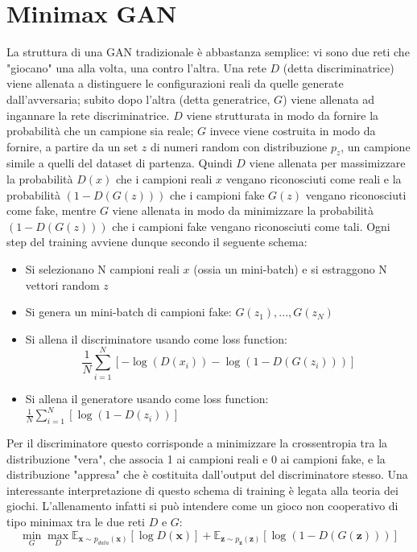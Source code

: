 \documentclass[Lau, noexaminfo, oneside]{sapthesis} %
\begin{document}
\section{Minimax GAN}
La struttura di una GAN tradizionale è abbastanza semplice: vi sono due reti che "giocano" una alla volta, una contro l'altra. Una rete $D$ (detta discriminatrice) viene allenata a distinguere le configurazioni reali da quelle generate dall'avversaria; subito dopo l'altra (detta generatrice, $G$) viene allenata ad ingannare la rete discriminatrice. $D$ viene strutturata in modo da fornire la probabilità che un campione sia reale; $G$ invece viene costruita in modo da fornire, a partire da un set $z$ di numeri random con distribuzione $p_z$, un campione simile a quelli del dataset di partenza. Quindi $D$ viene allenata per massimizzare la probabilità $D(x)$ che i campioni reali $x$ vengano riconosciuti come reali e la probabilità $(1-D(G(z)))$ che i campioni fake $G(z)$ vengano riconosciuti come fake, mentre $G$ viene allenata in modo da minimizzare la probabilità $(1-D(G(z)))$ che i campioni fake vengano riconosciuti come tali.
Ogni step del training avviene dunque secondo il seguente schema:
\begin{itemize}
\item Si selezionano N campioni reali $x$ (ossia un mini-batch) e si estraggono N vettori random $z$
\item Si genera un mini-batch di campioni fake: $G(z_1), ..., G(z_N)$
\item Si allena il discriminatore usando come loss function: 
\begin{equation}
\frac{1}{N}\sum_{i=1}^{N} [-\log(D(x_i)) - \log(1-D(G(z_i)))]
\end{equation}
\item Si allena il generatore usando come loss function: $\frac{1}{N}\sum_{i=1}^{N} [\log(1-D(z_i))]$
\end{itemize}
Per il discriminatore questo corrisponde a minimizzare la crossentropia tra la distribuzione "vera", che associa 1 ai campioni reali e 0 ai campioni fake, e la distribuzione "appresa" che è costituita dall'output del discriminatore stesso. Una interessante interpretazione di questo schema di training è legata alla teoria dei giochi. L'allenamento infatti si può intendere come un gioco non cooperativo di tipo minimax tra le due reti $D$ e $G$:
\begin{equation}
\min _{G}\max _{D}\mathbb {E} _{{\boldsymbol {x}}\sim p_{data}({\boldsymbol {x}})}[\log D({\boldsymbol {x}})]+\mathbb {E} _{{\boldsymbol {z}}\sim p_{\boldsymbol {z}}({\boldsymbol {z}})}[\log(1-D(G({\boldsymbol {z}})))]
\end{equation}
\end{document}

